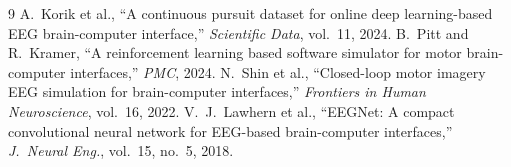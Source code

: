 \documentclass[11pt]{article}
\begin{document}
\begin{thebibliography}{9}
 A.~Korik et al., ``A continuous pursuit dataset for online deep learning-based EEG brain-computer interface,'' \textit{Scientific Data}, vol.~11, 2024.
 B.~Pitt and R.~Kramer, ``A reinforcement learning based software simulator for motor brain-computer interfaces,'' \textit{PMC}, 2024.
 N.~Shin et al., ``Closed-loop motor imagery EEG simulation for brain-computer interfaces,'' \textit{Frontiers in Human Neuroscience}, vol.~16, 2022.
 V.~J.~Lawhern et al., ``EEGNet: A compact convolutional neural network for EEG-based brain-computer interfaces,'' \textit{J.\ Neural Eng.}, vol.~15, no.~5, 2018.
\end{thebibliography}
\end{document}
